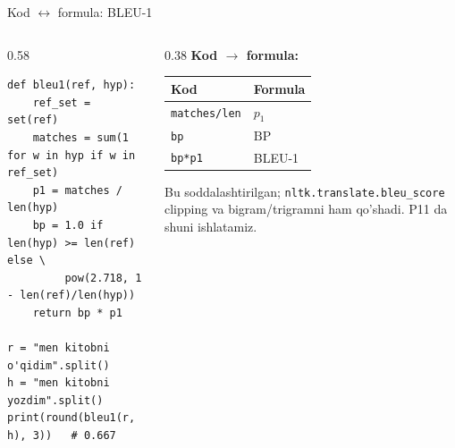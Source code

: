 \documentclass[aspectratio=169,11pt]{beamer}
\begin{document}
\begin{frame}[fragile]{Kod $\leftrightarrow$ formula: BLEU-1}
  \begin{columns}[T]
    \begin{column}{0.58\textwidth}
\begin{lstlisting}
def bleu1(ref, hyp):
    ref_set = set(ref)
    matches = sum(1 for w in hyp if w in ref_set)
    p1 = matches / len(hyp)
    bp = 1.0 if len(hyp) >= len(ref) else \
         pow(2.718, 1 - len(ref)/len(hyp))
    return bp * p1

r = "men kitobni o'qidim".split()
h = "men kitobni yozdim".split()
print(round(bleu1(r, h), 3))   # 0.667
\end{lstlisting}
    \end{column}
    \begin{column}{0.38\textwidth}
      \textbf{Kod $\to$ formula:}\\[3pt]
      \footnotesize
      \begin{tabular}{p{1.7cm}p{1.9cm}}
        \toprule
        Kod & Formula \\
        \midrule
        \texttt{matches/len} & $p_1$ \\
        \texttt{bp} & $\mathrm{BP}$ \\
        \texttt{bp*p1} & BLEU-1 \\
        \bottomrule
      \end{tabular}
      \vspace{4pt}
      \begin{tcolorbox}[warnbox,top=2pt,bottom=2pt]
        \footnotesize
        Bu soddalashtirilgan; \texttt{nltk.translate.bleu\_score} clipping va
        bigram/trigramni ham qo'shadi. P11 da shuni ishlatamiz.
      \end{tcolorbox}
    \end{column}
  \end{columns}
\end{frame}
\end{document}
